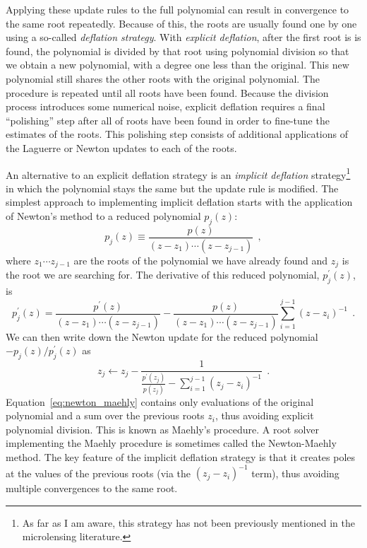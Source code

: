 \documentclass[12pt,dvipsnames]{report}
\newcommand{\ssf}[1]{\textsf{#1}}
\newcommand{\hquad}{~~}
\begin{document}
Applying these update rules to the full polynomial can result in convergence to the same 
root repeatedly. Because of this, the roots are usually found  one by one using a so-called
\emph{deflation strategy}. With \emph{explicit deflation}, after the first root is 
is found, the polynomial is divided by that root using polynomial division so 
that we  obtain a new  polynomial, with a degree one less than the original. This new
polynomial still shares the other roots with the original polynomial.
The procedure is repeated until all roots have been found. Because the division
process introduces some numerical noise, explicit deflation requires a final ``polishing''
step after all of roots have been found in order to fine-tune the estimates of the roots. 
This polishing step  consists of additional applications of the Laguerre or Newton 
updates to each of the roots.

An alternative to an explicit deflation strategy is an \emph{implicit deflation}
strategy\footnote{As far as I am aware, this strategy has not been previously mentioned in the 
microlensing literature.} \citep{cameron2021} in which the polynomial stays the same but the 
update rule is modified. The simplest approach to implementing implicit deflation starts with
the application of Newton's method to a reduced polynomial $p_j(z)$:
\begin{equation}
    p_{j}(z) \equiv \frac{p(z)}{\left(z-z_1\right) \cdots\left(z-z_{j-1}\right)}
    \hquad ,
    \label{eq:reduced_poly}
\end{equation}
where $z_1\cdots z_{j-1}$ are the roots of the polynomial we have already found and
$z_j$ is the root we are searching for.
The derivative of this reduced polynomial, $p^\prime_j(z)$, is
\begin{equation}
    p_{j}^{\prime}(z)=\frac{p^{\prime}(z)}{\left(z-z_1\right) \cdots\left(z-z_{j-1}\right)}-\frac{p(z)}{\left(z-z_1\right) \cdots\left(z-z_{j-1}\right)} \sum_{i=1}^{j-1}\left(z-z_{i}\right)^{-1}
    \hquad .
\end{equation}
We can then write down the Newton update for the reduced polynomial 
$-p_j(z)/p_j^{\prime}(z)$
as
\begin{equation}
    z_j \leftarrow z_j - \frac{1}{\frac{p^\prime (z_j)}{p(z_j)} - \sum_{i=1}^{j-1}\left(z_j-z_{i}\right)^{-1}}
    \hquad .
    \label{eq:newton_maehly}
\end{equation}
Equation~\ref{eq:newton_maehly} contains only evaluations of the original polynomial 
and a sum over the previous roots $z_i$, thus avoiding explicit polynomial 
division.  This is known as \ssf{Maehly's procedure}. A root solver implementing the 
Maehly procedure is sometimes called the \ssf{Newton-Maehly} method.
The key feature of the implicit deflation strategy is that it creates poles at the
values of the previous roots (via the $(z_j-z_i)^{-1}$ term), thus avoiding multiple
convergences to the same root.
\end{document}
